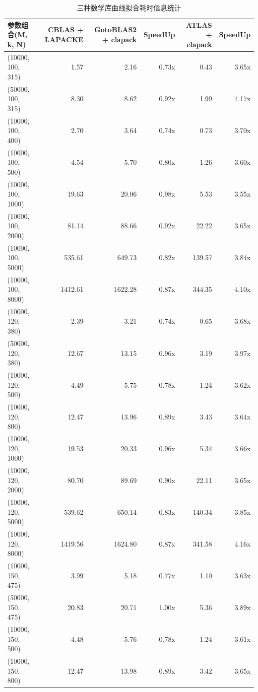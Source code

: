 \documentclass[a4paper]{article}
\begin{document}
\begin{table}[tbp]
  \centering
  \caption{三种数学库曲线拟合耗时信息统计}
  \begin{tabular}{l|r|rr|rr}
    \toprule
    参数组合(M, k, N) & CBLAS + LAPACKE & GotoBLAS2 + clapack & SpeedUp & ATLAS + clapack & SpeedUp\\
    \midrule
    (10000, 100, 315) & 1.57 & 2.16 & 0.73x & 0.43 & 3.65x \\
    \midrule
    (50000, 100, 315) & 8.30 & 8.62 & 0.92x & 1.99 &  4.17x \\
    \midrule
    (10000, 100, 400) & 2.70 & 3.64 & 0.74x & 0.73 & 3.70x \\
    \midrule
    (10000, 100, 500) & 4.54 & 5.70 & 0.80x & 1.26 & 3.60x \\
    \midrule
    (10000, 100, 1000) & 19.63 & 20.06 & 0.98x  & 5.53 & 3.55x \\
    \midrule
    (10000, 100, 2000) & 81.14 & 88.66 & 0.92x & 22.22 & 3.65x\\
    \midrule
    (10000, 100, 5000) & 535.61 & 649.73 & 0.82x & 139.57 & 3.84x \\
    \midrule
    (10000, 100, 8000) & 1412.61 & 1622.28 & 0.87x & 344.35 & 4.10x \\
    \midrule
    (10000, 120, 380) & 2.39 & 3.21 & 0.74x & 0.65 & 3.68x \\
    \midrule
    (50000, 120, 380) & 12.67 & 13.15 & 0.96x & 3.19 & 3.97x \\
    \midrule
    (10000, 120, 500) & 4.49 & 5.75 & 0.78x &  1.24 & 3.62x \\
    \midrule
    (10000, 120, 800) & 12.47 & 13.96 & 0.89x & 3.43 & 3.64x \\
    \midrule
    (10000, 120, 1000) & 19.53 & 20.33 & 0.96x &  5.34 & 3.66x\\
    \midrule
    (10000, 120, 2000) & 80.70 & 89.69 & 0.90x & 22.11 & 3.65x \\
    \midrule
    (10000, 120, 5000) & 539.62 & 650.14 & 0.83x & 140.34 & 3.85x\\
    \midrule
    (10000, 120, 8000) & 1419.56 & 1624.80 & 0.87x & 341.58 & 4.16x\\
    \midrule
    (10000, 150, 475) & 3.99 & 5.18 & 0.77x  & 1.10 & 3.63x \\
    \midrule
    (50000, 150, 475) & 20.83 & 20.71 & 1.00x & 5.36 & 3.89x \\
    \midrule
    (10000, 150, 500) & 4.48 & 5.76 & 0.78x & 1.24 & 3.61x \\
    \midrule
    (10000, 150, 800) & 12.47 & 13.98 & 0.89x & 3.42 & 3.65x \\

\end{tabular}
\end{table}
\end{document}
